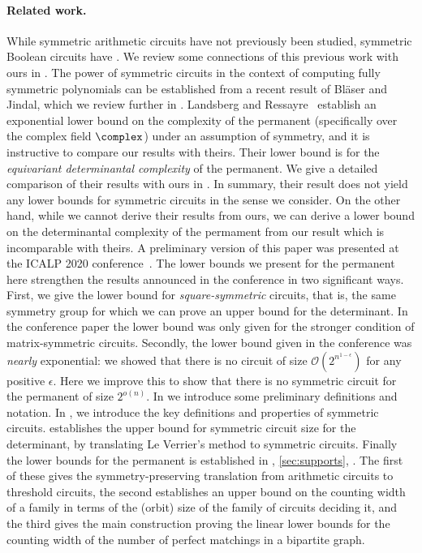 \documentclass{toc}
\begin{document}
\paragraph*{Related work.}
While symmetric arithmetic circuits have not previously been studied, symmetric
Boolean circuits have \cite{DenenbergGS86,Otto96,AndersonD17,Rossman19}.  
We review some connections of this previous work with ours in 
.  The power of symmetric circuits in the
context of computing fully symmetric polynomials can be established from
a recent result of Bl\"{a}ser and Jindal, which we review further in
.
Landsberg and Ressayre~\cite{LandsbergR16}
establish an exponential lower bound on the complexity of the permanent
(specifically over the complex field $\complex$) under an assumption of
symmetry, and it is instructive to compare our results with theirs. Their lower
bound is for the \emph{equivariant determinantal complexity} of the permanent.  We give a detailed comparison of their results with ours in .  In summary, their result does not yield any lower bounds for symmetric
circuits in the sense we consider.  On the other hand, while we cannot derive their results from ours, we can derive a lower bound on the determinantal complexity of the permament
%
%
from our result which is incomparable with theirs. 
A preliminary version of this %
paper  %
was presented at the ICALP 2020
%
conference~\cite{conf-version}.
The lower bounds we present for the permanent here strengthen the results announced in the conference in two significant ways.  First, we give the lower bound for \emph{square-symmetric} circuits, that is, the same symmetry group for which we can prove an upper bound for the determinant.  In the conference paper the lower bound was only given for the stronger condition of matrix-symmetric circuits.  Secondly, the lower bound given in the conference was \emph{nearly} exponential: we showed that there is no circuit of size $\mathcal{O}(2^{n^{1-\epsilon}})$ for any positive $\epsilon$.  Here we improve this to show that there is no symmetric circuit for the permanent of size $2^{o(n)}$.
In  we introduce some
preliminary definitions and notation. In , we
introduce the key definitions and properties of symmetric circuits.
 establishes the upper bound for symmetric circuit
size for the determinant, by translating Le Verrier's method to symmetric
circuits. Finally the lower bounds for the permanent is established in
, \ref{sec:supports},
. The first of these gives the symmetry-preserving
translation from arithmetic circuits to threshold circuits, the second
establishes an %
upper bound  %
on the counting width of a family in terms of the
(orbit) size of the family of circuits deciding it, and the third gives the main
construction proving the linear lower bounds for the counting width of the
number of perfect matchings in a bipartite graph.
\end{document}
